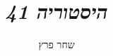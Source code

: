 \documentclass[]{../../../../tex/classes/styledArticle}
\author{שחר פרץ}
\title{\textit{היסטוריה 41}}
\begin{document}
	\maketitle
	
	
	\ndoc
\end{document}

